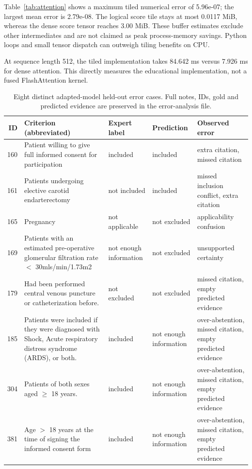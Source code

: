 Table~\ref{tab:attention} shows a maximum tiled numerical error of 5.96e-07; the largest mean error is 2.79e-08. The logical score tile stays at most 0.0117 MiB, whereas the dense score tensor reaches 3.00 MiB. These buffer estimates exclude other intermediates and are not claimed as peak process-memory savings. Python loops and small tensor dispatch can outweigh tiling benefits on CPU.

At sequence length 512, the tiled implementation takes 84.642 ms versus 7.926 ms for dense attention. This directly measures the educational implementation, not a fused FlashAttention kernel.

\begin{table}[t]\centering\scriptsize\caption{Eight distinct adapted-model held-out error cases. Full notes, IDs, gold and predicted evidence are preserved in the error-analysis file.}\label{tab:errors}\begin{tabular}{rp{4.4cm}p{2.1cm}p{2.1cm}p{4.2cm}}\toprule ID & Criterion (abbreviated) & Expert label & Prediction & Observed error\\\midrule

160 & Patient willing to give full informed consent for participation & included & included & extra citation, missed citation\\

161 & Patients undergoing elective carotid endarterectomy & not included & included & missed inclusion conflict, extra citation\\

165 & Pregnancy & not applicable & not excluded & applicability confusion\\

169 & Patients with an estimated pre-operative glomerular filtration rate \(<\) 30mls/min/1.73m2 & not enough information & not excluded & unsupported certainty\\

179 & Had been performed central venous puncture or catheterization before. & not excluded & not excluded & missed citation, empty predicted evidence\\

185 & Patients were included if they were diagnosed with Shock, Acute respiratory distress syndrome (ARDS), or both. & included & not enough information & over-abstention, missed citation, empty predicted evidence\\

304 & Patients of both sexes aged \(\geq\) 18 years. & included & not enough information & over-abstention, missed citation, empty predicted evidence\\

381 & Age \(>\) 18 years at the time of signing the informed consent form & included & not enough information & over-abstention, missed citation, empty predicted evidence\\

\bottomrule\end{tabular}\end{table}

